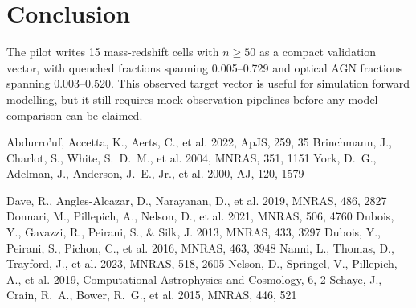 \documentclass[twocolumn]{aastex631}
\begin{document}
\section{Conclusion}\label{sec:conclusion}
The pilot writes 15 mass-redshift cells with $n \geq 50$ as a compact validation vector, with quenched fractions spanning 0.005--0.729 and optical AGN fractions spanning 0.003--0.520. This observed target vector is useful for simulation forward modelling, but it still requires mock-observation pipelines before any model comparison can be claimed.


\begin{thebibliography}{}
 Abdurro'uf, Accetta, K., Aerts, C., et al. 2022, ApJS, 259, 35
 Brinchmann, J., Charlot, S., White, S.~D.~M., et al. 2004, MNRAS, 351, 1151
 York, D.~G., Adelman, J., Anderson, J.~E., Jr., et al. 2000, AJ, 120, 1579

 Dave, R., Angles-Alcazar, D., Narayanan, D., et al. 2019, MNRAS, 486, 2827
 Donnari, M., Pillepich, A., Nelson, D., et al. 2021, MNRAS, 506, 4760
 Dubois, Y., Gavazzi, R., Peirani, S., \& Silk, J. 2013, MNRAS, 433, 3297
 Dubois, Y., Peirani, S., Pichon, C., et al. 2016, MNRAS, 463, 3948
 Nanni, L., Thomas, D., Trayford, J., et al. 2023, MNRAS, 518, 2605
 Nelson, D., Springel, V., Pillepich, A., et al. 2019, Computational Astrophysics and Cosmology, 6, 2
 Schaye, J., Crain, R.~A., Bower, R.~G., et al. 2015, MNRAS, 446, 521
\end{thebibliography}
\end{document}
